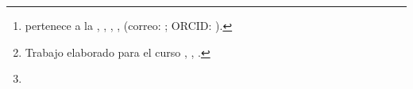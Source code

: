 \documentclass[journal]{IEEEtran}
\begin{document}
\title{\RSLTitulo}

\author{\AutorNombre%
\thanks{\AutorNombre{} pertenece a la \Escuela, \Facultad, \Universidad, \Ciudad, \Pais{}
(correo: \href{mailto:\AutorCorreo}{\AutorCorreo}; ORCID: \href{https://orcid.org/\AutorORCID}{\AutorORCID}).}%
\thanks{Trabajo elaborado para el curso \RSLCurso, \Escuela, \Universidad.}%
\thanks{\RSLFinanciamiento}}

\markboth{\RSLEncabezado}{\AutorNombreCorto: \RSLTituloCorto}

\maketitle











\printbibliography

\onecolumn
\appendices
{}   %
\renewcommand{\thetable}{\thesection\arabic{table}}\renewcommand{\thefigure}{\thesection\arabic{figure}}

\end{document}
